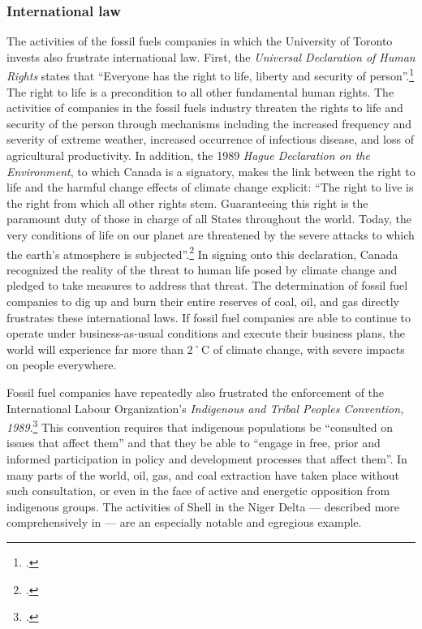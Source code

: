 		\subsubsection{International law}



The activities of the fossil fuels companies in which the University of Toronto invests also frustrate international law.  
First, the \emph{Universal Declaration of Human Rights} states that ``Everyone has the right to life, liberty and security of person''.\footcite[][]{UniversalDeclarationOfHumanRights}
The right to life is a precondition to all other fundamental human rights.  
The activities of companies in the fossil fuels industry threaten the rights to life and security of the person through mechanisms including the increased frequency and severity of extreme weather, increased occurrence of infectious disease, and loss of  agricultural productivity.
In addition, the 1989 \emph{Hague Declaration on the Environment}, to which Canada is a signatory, makes the link between the right to life and the harmful change effects of climate change explicit: ``The right to live is the right from which all other rights stem. Guaranteeing this right is the paramount duty of those in charge of all States throughout the world.  Today, the very conditions of life on our planet are threatened by the severe attacks to which the earth's atmosphere is subjected''.\footcite[][]{HagueDeclarationOnTheEnvironment}   
In signing onto this declaration, Canada recognized the reality of the threat to human life posed by climate change and pledged to take measures to address that threat.
The determination of fossil fuel companies to dig up and burn their entire reserves of coal, oil, and gas directly frustrates these international laws.
If fossil fuel companies are able to continue to operate under business-as-usual conditions and execute their business plans, the world will experience far more than 2˚C of climate change, with severe impacts on people everywhere.



Fossil fuel companies have repeatedly also frustrated the enforcement of the International Labour Organization's \emph{Indigenous and Tribal Peoples Convention, 1989}.\footcite[][]{ILOConv169}
This convention requires that indigenous populations be ``consulted on issues that affect them'' and that they be able to ``engage in free, prior and informed participation in policy and development processes that affect them''.
In many parts of the world, oil, gas, and coal extraction have taken place without such consultation, or even in the face of active and energetic opposition from indigenous groups.
The activities of Shell in the Niger Delta --- described more comprehensively in  --- are an especially notable and egregious example.



